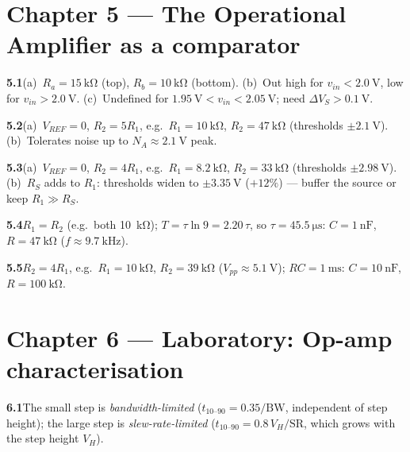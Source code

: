\documentclass[11pt,a4paper,oneside]{book}
\newcommand{\ans}[1]{\par\smallskip\noindent\textbf{#1}\quad\ignorespaces}
\begin{document}
\section*{Chapter 5 --- The Operational Amplifier as a comparator}
\ans{5.1}(a)~$R_a=\qty{15}{\kilo\ohm}$ (top), $R_b=\qty{10}{\kilo\ohm}$ (bottom).
(b)~Out high for $v_{in}<\qty{2.0}{\volt}$, low for $v_{in}>\qty{2.0}{\volt}$.
(c)~Undefined for $\qty{1.95}{\volt}<v_{in}<\qty{2.05}{\volt}$; need
$\Delta V_S>\qty{0.1}{\volt}$.
\ans{5.2}(a)~$V_{REF}=0$, $R_2=5R_1$, e.g.\ $R_1=\qty{10}{\kilo\ohm}$,
$R_2=\qty{47}{\kilo\ohm}$ (thresholds $\pm\qty{2.1}{\volt}$).
(b)~Tolerates noise up to $N_A\approx\qty{2.1}{\volt}$ peak.
\ans{5.3}(a)~$V_{REF}=0$, $R_2=4R_1$, e.g.\ $R_1=\qty{8.2}{\kilo\ohm}$,
$R_2=\qty{33}{\kilo\ohm}$ (thresholds $\pm\qty{2.98}{\volt}$).
(b)~$R_S$ adds to $R_1$: thresholds widen to $\pm\qty{3.35}{\volt}$ ($+12\%$) ---
buffer the source or keep $R_1\gg R_S$.
\ans{5.4}$R_1=R_2$ (e.g.\ both \qty{10}{\kilo\ohm}); $T=\tau\ln9=2.20\,\tau$, so
$\tau=\qty{45.5}{\micro\second}$: $C=\qty{1}{\nano\farad}$,
$R=\qty{47}{\kilo\ohm}$ ($f\approx\qty{9.7}{\kilo\hertz}$).
\ans{5.5}$R_2=4R_1$, e.g.\ $R_1=\qty{10}{\kilo\ohm}$, $R_2=\qty{39}{\kilo\ohm}$
($V_{pp}\approx\qty{5.1}{\volt}$); $RC=\qty{1}{\milli\second}$:
$C=\qty{10}{\nano\farad}$, $R=\qty{100}{\kilo\ohm}$.

\section*{Chapter 6 --- Laboratory: Op-amp characterisation}
\ans{6.1}The small step is \emph{bandwidth-limited}
($t_{10\text{--}90}=0.35/\text{BW}$, independent of step height); the large step
is \emph{slew-rate-limited} ($t_{10\text{--}90}=0.8\,V_H/\text{SR}$, which grows
with the step height $V_H$).
\end{document}
